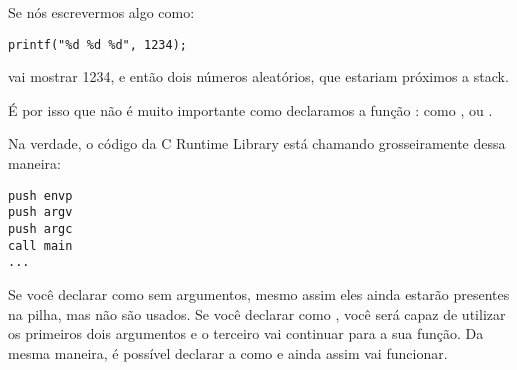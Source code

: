 Se nós escrevermos algo como:

\begin{lstlisting}
printf("%d %d %d", 1234);
\end{lstlisting}

\printf vai mostrar 1234, e então dois números aleatórios, que estariam próximos a stack.

\par
É por isso que não é muito importante como declaramos a função \main{}: como \main{},  ou .

Na verdade, o código da C Runtime Library está chamando grosseiramente \main{} dessa maneira:
	
\begin{lstlisting}
push envp
push argv
push argc
call main
...
\end{lstlisting}

Se você declarar \main como \main sem argumentos, mesmo assim eles ainda estarão presentes na pilha, mas não são usados.
Se você declarar \main como , você será capaz de utilizar os primeiros dois argumentos e o terceiro vai continuar  para a sua função.
Da mesma maneira, é possível declarar a \main como  e ainda assim vai funcionar.

